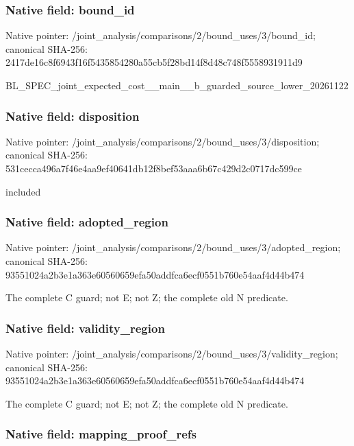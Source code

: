 \documentclass[10pt,a4paper]{article}
\begin{document}
\subsubsection{Native field: bound\_id}


Native pointer: /joint\_analysis/comparis\allowbreak{}ons/2/bound\_uses/3/bound\allowbreak{}\_id; canonical SHA-256: 2417de16c8f6943f16f54358\allowbreak{}54280a55cb5f28bd14f8d48c\allowbreak{}748f5558931911d9


BL\_SPEC\_joint\_expected\_c\allowbreak{}ost\_\_main\_\_b\_guarded\_sou\allowbreak{}rce\_lower\_20261122


\subsubsection{Native field: disposition}


Native pointer: /joint\_analysis/comparis\allowbreak{}ons/2/bound\_uses/3/dispo\allowbreak{}sition; canonical SHA-256: 531cecca496a7f46e4aa9ef4\allowbreak{}0641db12f8bef53aaa6b67c4\allowbreak{}29d2c0717dc599ce


included


\subsubsection{Native field: adopted\_region}


Native pointer: /joint\_analysis/comparis\allowbreak{}ons/2/bound\_uses/3/adopt\allowbreak{}ed\_region; canonical SHA-256: 93551024a2b3e1a363e60560\allowbreak{}659efa50addfca6ecf0551b7\allowbreak{}60e54aaf4d44b474


The complete C guard; not E; not Z; the complete old N predicate.


\subsubsection{Native field: validity\_region}


Native pointer: /joint\_analysis/comparis\allowbreak{}ons/2/bound\_uses/3/valid\allowbreak{}ity\_region; canonical SHA-256: 93551024a2b3e1a363e60560\allowbreak{}659efa50addfca6ecf0551b7\allowbreak{}60e54aaf4d44b474


The complete C guard; not E; not Z; the complete old N predicate.


\subsubsection{Native field: mapping\_proof\_refs}
\end{document}

